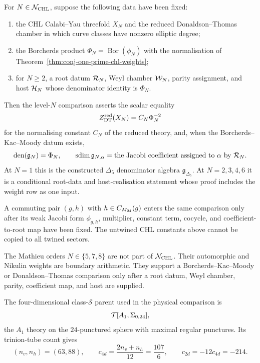 \begin{conjecture}
\label{conj:lorgat-one-prime-chl-scope}
For $N\in\mathcal{N}_{\mathrm{CHL}}$, suppose the following data have been fixed:
\begin{enumerate}
\item the CHL Calabi--Yau threefold $X_N$ and the reduced
Donaldson--Thomas chamber in which curve classes have nonzero elliptic
degree;
\item the Borcherds product $\Phi_N=\operatorname{Bor}(\phi_N)$ with
the normalisation of Theorem~\ref{thm:conj-one-prime-chl-weights};
\item for $N\geq 2$, a root datum $\mathcal{R}_N$, Weyl chamber $\mathcal{W}_N$, parity
assignment, and host $\mathcal{H}_N$ whose denominator identity is $\Phi_N$.
\end{enumerate}
Then the level-$N$ comparison asserts the scalar equality
\[
  Z^{\mathrm{red}}_{\mathrm{DT}}(X_N)=C_N\Phi_N^{-2}
\]
for the normalising constant $C_N$ of the reduced theory, and, when the
Borcherds--Kac--Moody datum exists,
\[
  \operatorname{den}(\mathfrak g_N)=\Phi_N,\qquad
  \operatorname{sdim} \mathfrak g_{N,\alpha}
  = \text{the Jacobi coefficient assigned to }\alpha\text{ by }\mathcal{R}_N .
\]
At $N=1$ this is the constructed $\Delta_5$ denominator algebra
$\mathfrak g_{\Delta_5}$.  At $N=2,3,4,6$ it is a conditional
root-data and host-realisation statement whose proof includes the
weight row as one input.
\end{conjecture}

\begin{remark}
\label{rem:conj-one-prime-twined-pairs}
A commuting pair $(g,h)$ with $h\in C_{M_{24}}(g)$ enters the same
comparison only after its weak Jacobi form $\phi_{g,h}$, multiplier,
constant term, cocycle, and coefficient-to-root map have been fixed.
The untwined CHL constants above cannot be copied to all twined sectors.
\end{remark}

\begin{remark}
\label{rem:conj-one-prime-non-chl-orders}
The Mathieu orders $N\in\{5,7,8\}$ are not part of
$\mathcal{N}_{\mathrm{CHL}}$.  Their automorphic and Nikulin weights are boundary
arithmetic.  They support a Borcherds--Kac--Moody or
Donaldson--Thomas comparison only after a root datum, Weyl chamber,
parity, coefficient map, and host are supplied.
\end{remark}

\begin{proposition}
\label{prop:conj-one-prime-class-s-parent}
The four-dimensional class-$\mathcal S$ parent used in the physical
comparison is
\[
  \mathcal{T}[A_1,\Sigma_{0,24}],
\]
the $A_1$ theory on the $24$-punctured sphere with maximal regular
punctures.  Its trinion-tube count gives
\[
  (n_v,n_h)=(63,88),\qquad
  c_{4d}=\frac{2n_v+n_h}{12}=\frac{107}{6},\qquad
  c_{2d}=-12c_{4d}=-214 .
\]
\end{proposition}

